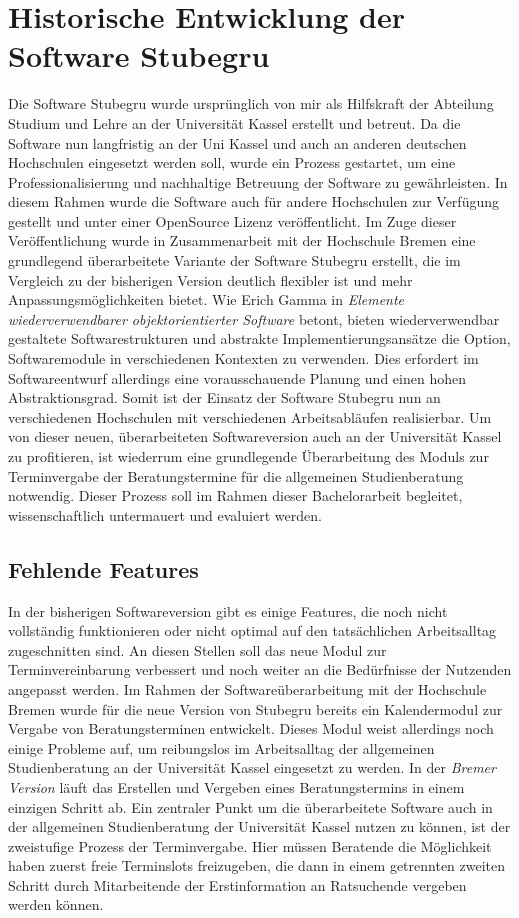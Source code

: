 \section{Historische Entwicklung der Software Stubegru}
Die Software Stubegru wurde ursprünglich von mir als Hilfskraft der Abteilung
Studium und Lehre an der Universität Kassel erstellt und betreut. Da die
Software nun langfristig an der Uni Kassel und auch an anderen deutschen
Hochschulen eingesetzt werden soll, wurde ein Prozess gestartet, um eine
Professionalisierung und nachhaltige Betreuung der Software zu gewährleisten.
In diesem Rahmen wurde die Software auch für andere Hochschulen zur Verfügung
gestellt und unter einer OpenSource Lizenz veröffentlicht. Im Zuge dieser
Veröffentlichung wurde in Zusammenarbeit mit der Hochschule Bremen eine
grundlegend überarbeitete Variante der Software Stubegru erstellt, die im
Vergleich zu der bisherigen Version deutlich flexibler ist und mehr
Anpassungsmöglichkeiten bietet. Wie Erich Gamma in \textit{Elemente
    wiederverwendbarer objektorientierter Software} betont, bieten wiederverwendbar
gestaltete Softwarestrukturen und abstrakte Implementierungsansätze die Option,
Softwaremodule in verschiedenen Kontexten zu verwenden. Dies erfordert im
Softwareentwurf allerdings eine vorausschauende Planung und einen hohen
Abstraktionsgrad\cite{wiederverwSoftware}. Somit ist der Einsatz der Software
Stubegru nun an verschiedenen Hochschulen mit verschiedenen Arbeitsabläufen
realisierbar. Um von dieser neuen, überarbeiteten Softwareversion auch an der
Universität Kassel zu profitieren, ist wiederrum eine grundlegende
Überarbeitung des Moduls zur Terminvergabe der Beratungstermine für die
allgemeinen Studienberatung notwendig. Dieser Prozess soll im Rahmen dieser
Bachelorarbeit begleitet, wissenschaftlich untermauert und evaluiert werden.

\subsection*{Fehlende Features}
In der bisherigen Softwareversion gibt es einige Features, die noch nicht
vollständig funktionieren oder nicht optimal auf den tatsächlichen
Arbeitsalltag zugeschnitten sind. An diesen Stellen soll das neue Modul zur
Terminvereinbarung verbessert und noch weiter an die Bedürfnisse der Nutzenden
angepasst werden. Im Rahmen der Softwareüberarbeitung mit der Hochschule Bremen
wurde für die neue Version von Stubegru bereits ein Kalendermodul zur Vergabe
von Beratungsterminen entwickelt. Dieses Modul weist allerdings noch einige
Probleme auf, um reibungslos im Arbeitsalltag der allgemeinen Studienberatung
an der Universität Kassel eingesetzt zu werden. In der \textit{Bremer Version} läuft
das Erstellen und Vergeben eines Beratungstermins in einem einzigen Schritt ab.
Ein zentraler Punkt um die überarbeitete Software auch in der allgemeinen
Studienberatung der Universität Kassel nutzen zu können, ist der zweistufige
Prozess der Terminvergabe. Hier müssen Beratende die Möglichkeit haben zuerst
freie Terminslots freizugeben, die dann in einem getrennten zweiten Schritt
durch Mitarbeitende der Erstinformation an Ratsuchende vergeben werden können.

